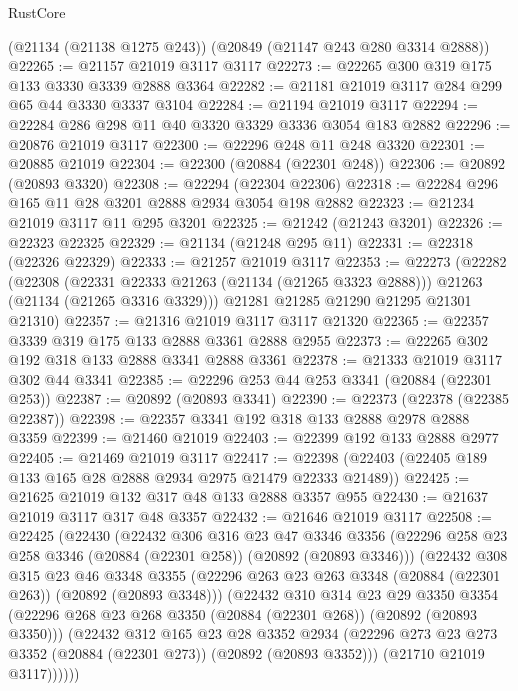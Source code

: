 \begin{lexlean}{RustCore}
\begin{coremodule}
    (@21134 (@21138 @1275 @243))
    (@20849 (@21147 @243 @280 @3314 @2888))
@22265 := @21157 @21019 @3117 @3117
@22273 := @22265 @300 @319 @175 @133 @3330 @3339 @2888 @3364
@22282 := @21181 @21019 @3117 @284 @299 @65 @44 @3330 @3337 @3104
@22284 := @21194 @21019 @3117
@22294 := @22284 @286 @298 @11 @40 @3320 @3329 @3336 @3054 @183 @2882
@22296 := @20876 @21019 @3117
@22300 := @22296 @248 @11 @248 @3320
@22301 := @20885 @21019
@22304 := @22300 (@20884 (@22301 @248))
@22306 := @20892 (@20893 @3320)
@22308 := @22294 (@22304 @22306)
@22318 := @22284 @296 @165 @11 @28 @3201 @2888 @2934 @3054 @198 @2882
@22323 := @21234 @21019 @3117 @11 @295 @3201
@22325 := @21242 (@21243 @3201)
@22326 := @22323 @22325
@22329 := @21134 (@21248 @295 @11)
@22331 := @22318 (@22326 @22329)
@22333 := @21257 @21019 @3117
@22353 := @22273
    (@22282
      (@22308
        (@22331 @22333 @21263 (@21134 (@21265 @3323 @2888)))
        @21263
        (@21134 (@21265 @3316 @3329)))
      @21281
      @21285
      @21290
      @21295
      @21301
      @21310)
@22357 := @21316 @21019 @3117 @3117 @21320
@22365 := @22357 @3339 @319 @175 @133 @2888 @3361 @2888 @2955
@22373 := @22265 @302 @192 @318 @133 @2888 @3341 @2888 @3361
@22378 := @21333 @21019 @3117 @302 @44 @3341
@22385 := @22296 @253 @44 @253 @3341 (@20884 (@22301 @253))
@22387 := @20892 (@20893 @3341)
@22390 := @22373 (@22378 (@22385 @22387))
@22398 := @22357 @3341 @192 @318 @133 @2888 @2978 @2888 @3359
@22399 := @21460 @21019
@22403 := @22399 @192 @133 @2888 @2977
@22405 := @21469 @21019 @3117
@22417 := @22398 (@22403 (@22405 @189 @133 @165 @28 @2888 @2934 @2975 @21479 @22333 @21489))
@22425 := @21625 @21019 @132 @317 @48 @133 @2888 @3357 @955
@22430 := @21637 @21019 @3117 @317 @48 @3357
@22432 := @21646 @21019 @3117
@22508 := @22425
    (@22430
      (@22432
        @306
        @316
        @23
        @47
        @3346
        @3356
        (@22296 @258 @23 @258 @3346 (@20884 (@22301 @258)) (@20892 (@20893 @3346)))
        (@22432
          @308
          @315
          @23
          @46
          @3348
          @3355
          (@22296 @263 @23 @263 @3348 (@20884 (@22301 @263)) (@20892 (@20893 @3348)))
          (@22432
            @310
            @314
            @23
            @29
            @3350
            @3354
            (@22296 @268 @23 @268 @3350 (@20884 (@22301 @268)) (@20892 (@20893 @3350)))
            (@22432
              @312
              @165
              @23
              @28
              @3352
              @2934
              (@22296 @273 @23 @273 @3352 (@20884 (@22301 @273)) (@20892 (@20893 @3352)))
              (@21710 @21019 @3117))))))

\end{coremodule}
\end{lexlean}
